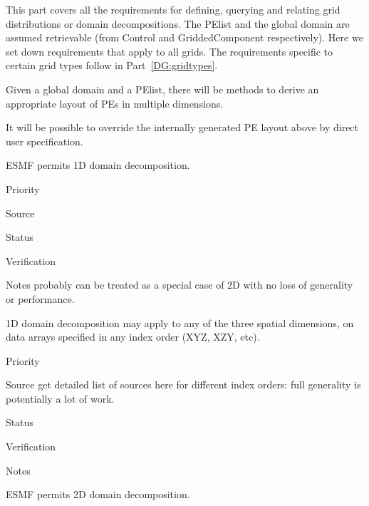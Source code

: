 
This part covers all the requirements for defining, querying and
relating grid distributions or domain decompositions. The PElist and
the global domain are assumed retrievable (from Control and
GriddedComponent respectively). Here we set down requirements that
apply to all grids. The requirements specific to certain grid
types follow in Part~\ref{DG:gridtypes}.



Given a global domain and a PElist, there will be methods to derive an
appropriate layout of PEs in multiple dimensions.


It will be possible to override the internally generated PE layout above
by direct user specification.


ESMF permits 1D domain decomposition.

\begin{reqlist}
\item[Priority]
\item[Source]
\item[Status]
\item[Verification]
\item[Notes] probably can be treated as a special case of 2D with no
  loss of generality or performance.
\end{reqlist}


1D domain decomposition may apply to any of the three spatial
dimensions, on data arrays specified in any index order (XYZ, XZY,
etc).

\begin{reqlist}
\item[Priority]
\item[Source] get detailed list of sources here for different index
  orders: full generality is potentially a lot of work.
\item[Status]
\item[Verification]
\item[Notes]
\end{reqlist}


ESMF permits 2D domain decomposition.

